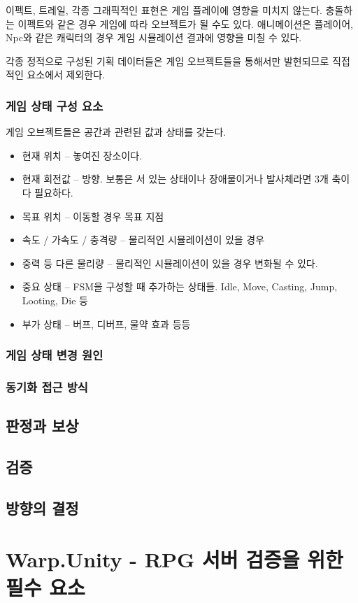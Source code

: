 \documentclass[ %
    a4paper,    %
    amsmath,    %
    itemph,     %
]{oblivoir}     %
\theoremstyle{definition}
\theoremstyle{remark}
\theoremstyle{plain}
\begin{document}
이펙트, 트레일, 각종 그래픽적인 표현은 게임 플레이에 영향을 미치지 않는다.
충돌하는 이펙트와 같은 경우 게임에 따라 오브젝트가 될 수도 있다.
애니메이션은 플레이어, Npc와 같은 캐릭터의 경우 게임 시뮬레이션 결과에 영향을 미칠 수 있다.

각종 정적으로 구성된 기획 데이터들은 게임 오브젝트들을 통해서만 발현되므로 직접적인 요소에서 제외한다.

\subsubsection{게임 상태 구성 요소}

게임 오브젝트들은 공간과 관련된 값과 상태를 갖는다.

\begin{tcolorbox}[colback=green!5,colframe=green!40!black,title=공간 요소]
\begin{itemize}
  \item{현재 위치} -- 놓여진 장소이다.
  \item{현재 회전값} -- 방향. 보통은 서 있는 상태이나 장애물이거나 발사체라면 3개 축이 다 필요하다.
  \item{목표 위치} -- 이동할 경우 목표 지점
  \item{속도 / 가속도 / 충격량} -- 물리적인 시뮬레이션이 있을 경우
  \item{중력 등 다른 물리량} -- 물리적인 시뮬레이션이 있을 경우 변화될 수 있다.
\end{itemize}
\end{tcolorbox}

\begin{tcolorbox}[colback=green!5,colframe=green!40!black,title=상태 요소]
\begin{itemize}
  \item{중요 상태} -- FSM을 구성할 때 추가하는 상태들. Idle, Move, Casting, Jump, Looting, Die 등
  \item{부가 상태} -- 버프, 디버프, 물약 효과 등등
\end{itemize}
\end{tcolorbox}

\subsubsection{게임 상태 변경 원인}



\subsubsection{동기화 접근 방식}


\subsection{판정과 보상}


\subsection{검증}


\subsection{방향의 결정}


\section{Warp.Unity - RPG 서버 검증을 위한 필수 요소}
\end{document}

